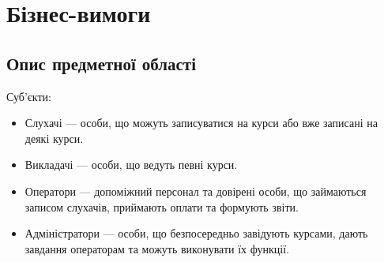 \section{Бізнес-вимоги}
\subsection{Опис предметної області}

Суб'єкти:

\begin{itemize}
\item Слухачі --- особи, що можуть записуватися на курси або вже записані на деякі курси.
\item Викладачі --- особи, що ведуть певні курси.
\item Оператори --- допоміжний персонал та довірені особи, що займаються записом слухачів, приймають оплати та формують звіти.
\item Адміністратори --- особи, що безпосередньо завідують курсами, дають завдання операторам та можуть виконувати їх функції.
\end{itemize}

